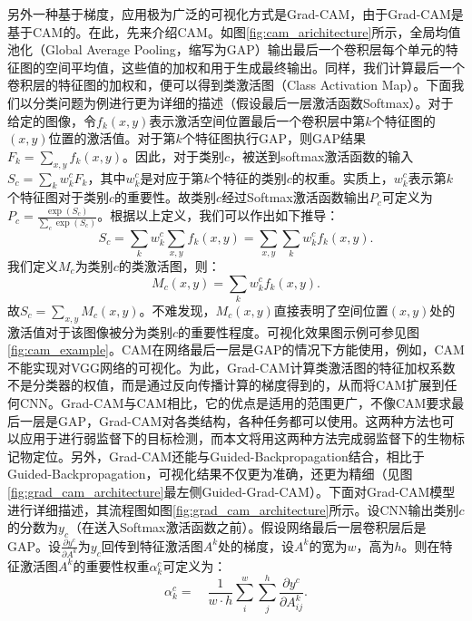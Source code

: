 另外一种基于梯度，应用极为广泛的可视化方式是Grad-CAM，由于Grad-CAM是基于CAM的。在此，先来介绍CAM。如图\ref{fig:cam_arichitecture}所示，全局均值池化（Global Average Pooling，缩写为GAP）输出最后一个卷积层每个单元的特征图的空间平均值，这些值的加权和用于生成最终输出。同样，我们计算最后一个卷积层的特征图的加权和，便可以得到类激活图（Class Activation Map）。下面我们以分类问题为例进行更为详细的描述（假设最后一层激活函数Softmax）。对于给定的图像，令$f_k(x, y)$表示激活空间位置最后一个卷积层中第$k$个特征图的$(x,y)$位置的激活值。对于第$k$个特征图执行GAP，则GAP结果$F_k=\sum_{x, y} f_{k}(x,y)$。因此，对于类别$c$，被送到softmax激活函数的输入$S_c=\sum_{k} w_{k}^{c} F_{k}$，其中$w_k^c$是对应于第$k$个特征的类别$c$的权重。实质上，$w_{k}^{c}$表示第$k$个特征图对于类别$c$的重要性。故类别$c$经过Softmax激活函数输出$P_c$可定义为$
P_c=\frac{\exp \left(S_{c}\right)}{\sum_{c} \exp \left(S_{c}\right)}$。根据以上定义，我们可以作出如下推导： 
\begin{equation*}
S_{c}=\sum_{k} w_{k}^{c} \sum_{x, y} f_{k}(x, y)=\sum_{x, y} \sum_{k} w_{k}^{c} f_{k}(x, y).
\end{equation*}
我们定义$M_c$为类别$c$的类激活图，则：
\begin{equation}\label{equ:cam_heatmap_compute}
M_{c}(x, y)=\sum_{k} w_{k}^{c} f_{k}(x, y).
\end{equation}
故$S_{c}=\sum_{x,y} M_{c}(x, y)$。不难发现，$M_{c}(x, y)$直接表明了空间位置$(x,y)$处的激活值对于该图像被分为类别$c$的重要性程度。可视化效果图示例可参见图\ref{fig:cam_example}。CAM在网络最后一层是GAP的情况下方能使用，例如，CAM不能实现对VGG网络的可视化。为此，Grad-CAM计算类激活图的特征加权系数不是分类器的权值，而是通过反向传播计算的梯度得到的，从而将CAM扩展到任何CNN。Grad-CAM与CAM相比，它的优点是适用的范围更广，不像CAM要求最后一层是GAP，Grad-CAM对各类结构，各种任务都可以使用。这两种方法也可以应用于进行弱监督下的目标检测，而本文将用这两种方法完成弱监督下的生物标记物定位。另外，Grad-CAM还能与Guided-Backpropagation结合，相比于Guided-Backpropagation，可视化结果不仅更为准确，还更为精细（见图\ref{fig:grad_cam_architecture}最左侧Guided-Grad-CAM）。下面对Grad-CAM模型进行详细描述，其流程图如图\ref{fig:grad_cam_architecture}所示。设CNN输出类别$c$的分数为$y_c$（在送入Softmax激活函数之前）。假设网络最后一层卷积层后是GAP。设$\frac{\partial y^{c}}{\partial A^{k}}$为$y_c$回传到特征激活图$A^{k}$处的梯度，设$A^{k}$的宽为$w$，高为$h$。则在特征激活图$A^{k}$的重要性权重$\alpha_{k}^{c}$可定义为：
\begin{equation}
\alpha_{k}^{c}=\quad \frac{1}{w·h} \sum_{i}^{w} \sum_{j}^{h} \frac{\partial y^{c}}{\partial A_{i j}^{k}}.
\end{equation}
